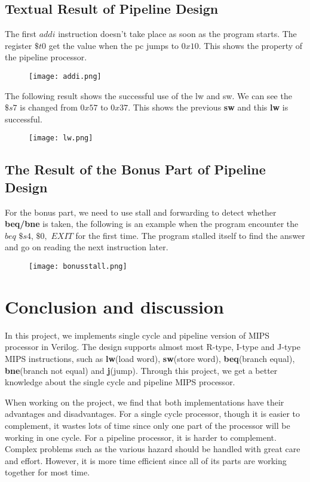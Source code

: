 \documentclass{article}[12pt]
\begin{document}
	\subsection{Textual Result of Pipeline Design}
		
		The first $addi$ instruction doesn't take place as soon as the program starts. The register $\$t0$ get the value when the pc jumps to $0x10$. This shows the property of the pipeline processor.
		\begin{figure}[H]
			\centering
			\texttt{[image: addi.png]}
		\end{figure}
		The following result shows the successful use of the lw and sw. We can see the $\$s7$ is changed from $0x57$ to $0x37$. This shows the previous \textbf{sw} and this \textbf{lw} is successful.
		\begin{figure}[H]
			\centering
			\texttt{[image: lw.png]}
		\end{figure}
	\subsection{The Result of the Bonus Part of Pipeline Design}
		For the bonus part, we need to use stall and forwarding to detect whether \textbf{beq/bne} is taken, the following is an example when the program encounter the $beq$ $\$ s4$, $\$0,$ $EXIT$ for the first time. The program stalled itself to find the answer and go on reading the next instruction later.
		\begin{figure}[H]
			\centering
			\texttt{[image: bonusstall.png]}
		\end{figure}
	\section{Conclusion and discussion}
	In this project, we implements single cycle and pipeline version of MIPS processor in Verilog. The design supports almost most R-type, I-type and J-type MIPS instructions, such as \textbf{lw}(load word), \textbf{sw}(store word), \textbf{beq}(branch equal), \textbf{bne}(branch not equal) and \textbf{j}(jump). Through this project, we get a better knowledge about the single cycle and pipeline MIPS processor.
	\par When working on the project, we find that both implementations have their advantages and disadvantages. For a single cycle processor, though it is easier to complement, it wastes lots of time since only one part of the processor will be working in one cycle. For a pipeline processor, it is harder to complement. Complex problems such as the various hazard should be handled with great care and effort. However, it is more time efficient since all of its parts are working together for most time.
	
\end{document}
